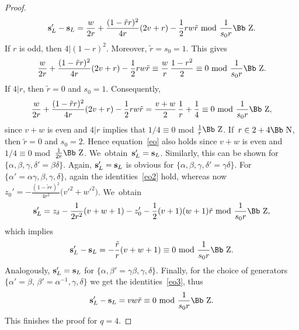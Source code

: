 \documentclass[pdftex]{sigma}
\newcommand\NN{{\mbox{\Bb N}}}
\newcommand\ZZ{{\mbox{\Bb Z}}}
\newcommand\bs{\textbf{{\rm \textbf{s}}}}
\numberwithin{equation}{section}
\begin{document}
\begin{proof}
\begin{gather*}
 \bs_L'-\bs_L=\frac w{2r}+\frac{(1-\tilde r r)^2}{4r}(2v+r)-\frac12 rw\tilde r\ {\rm mod}\ \frac{1}{s_0r}\ZZ.
 \end{gather*}
If $r$ is odd, then $4|(1-r)^2$. Moreover, $\tilde r=s_0=1$. This gives
\begin{gather*}
\frac w{2r}+\frac{(1-\tilde r r)^2}{4r}(2v+r)-\frac12 rw\tilde r \equiv \frac wr\, \frac{1-r^2}2 \equiv 0\ {\rm mod}\ \frac{1}{s_0r}\ZZ.
\end{gather*}
If $4|r$, then $\tilde r=0$ and $s_0=1$. Consequently,
\begin{gather}\label{eo}
\frac w{2r}+\frac{(1-\tilde r r)^2}{4r}(2v+r)-\frac12 rw\tilde r = \frac {v+w}2\, \frac 1r +\frac14 \equiv 0\ {\rm mod}\ \frac{1}{s_0r}\ZZ,
\end{gather}
since $v+w$ is even and $4|r$ implies that $1/4\equiv 0$ mod $\frac1r \ZZ$. If~$r\in 2+4\NN$, then $\tilde r=0$ and $s_0=2$. Hence equation~\eqref{eo} also holds since $v+w$ is even and $1/4\equiv 0$ mod~$\frac 1{2r}\ZZ$. We~obtain~$\bs_L'=\bs_L$. Similarly, this can be shown for $\{\alpha,\beta,\gamma,\delta'=\beta\delta\}$. Again, $\bs_L'=\bs_L$ is obvious for $\{\alpha,\beta,\gamma,\mbox{$\delta'=\gamma\delta$}\}$. For $\{\alpha'=\alpha\gamma,\beta,\gamma,\delta\}$, again the identities~\eqref{eo2} hold, whereas now $z_0'=-\frac{(1-\tilde r r)^2}{4r^2}\big(v'^2+w'^2\big)$. We~obtain
\begin{gather*}
\bs_L'=z_\delta-\frac1{2r^2}(v+w+1) -z_0'-\frac12(v+1)(w+1)\tilde r\ {\rm mod}\ \frac{1}{s_0r}\ZZ,
\end{gather*}
which implies
\begin{gather*}
\bs_L'-\bs_L=-\frac{\tilde r}r(v+w+1) \equiv 0\ {\rm mod}\ \frac{1}{s_0r}\ZZ.
\end{gather*}
Analogously, $\bs_L'=\bs_L$ for $\{\alpha,\beta'=\gamma\beta,\gamma,\delta\}$.
Finally, for the choice of generators $\{\alpha'=\beta,\, \beta'=\alpha^{-1},\gamma,\delta\}$ we get the identities~\eqref{eo3}, thus
\begin{gather*}
\bs_L'-\bs_L=vw\tilde r \equiv 0\ {\rm mod}\ \frac{1}{s_0r}\ZZ.
\end{gather*}
This finishes the proof for $q=4$.
\end{proof}
\end{document}
